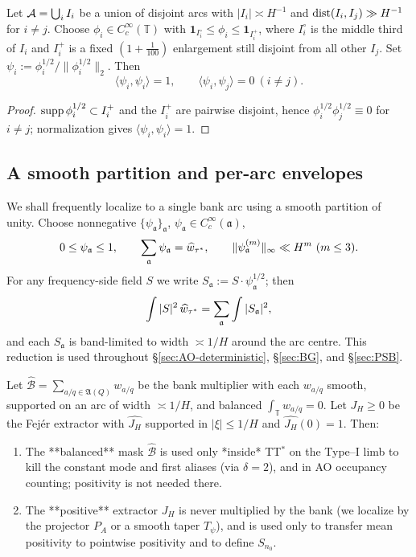 \begin{lemma}\label{lem:AO-gram-full}
Let $\mathcal{A}=\bigcup_i I_i$ be a union of disjoint arcs with $|I_i|\asymp H^{-1}$ and $\operatorname{dist}(I_i,I_j)\gg H^{-1}$ for $i\neq j$.
Choose $\phi_i\in C_c^\infty(\mathbb T)$ with $\mathbf 1_{I_i^\circ}\le \phi_i\le \mathbf 1_{I_i^{+}}$, where $I_i^\circ$ is the middle third of $I_i$ and $I_i^{+}$ is a fixed $(1+\tfrac1{100})$ enlargement still disjoint from all other $I_j$.
Set $\psi_i:=\phi_i^{1/2}/\|\phi_i^{1/2}\|_{2}$. Then
\[
\langle \psi_i,\psi_i\rangle=1,\qquad \langle \psi_i,\psi_j\rangle=0\ (i\ne j).
\]
\end{lemma}
\begin{proof}
$\operatorname{supp}\phi_i^{1/2}\subset I_i^{+}$ and the $I_i^{+}$ are pairwise disjoint, hence $\phi_i^{1/2}\phi_j^{1/2}\equiv 0$ for $i\neq j$; normalization gives $\langle\psi_i,\psi_i\rangle=1$.
\end{proof}


\subsection{A smooth partition and per-arc envelopes}
We shall frequently localize to a single bank arc using a smooth partition of unity. Choose nonnegative $\{\psi_{\mathfrak a}\}_{\mathfrak a}$, $\psi_{\mathfrak a}\in C_c^\infty(\mathfrak a)$,
\[
0\le \psi_{\mathfrak a}\le 1,\qquad \sum_{\mathfrak a}\psi_{\mathfrak a}=\widehat w_{\tau^\ast},\qquad
\|\psi_{\mathfrak a}^{(m)}\|_\infty\ll H^m\ (m\le 3).
\]
For any frequency-side field $S$ we write $S_{\mathfrak a}:=S\cdot \psi_{\mathfrak a}^{1/2}$; then
\[
\int |S|^2\,\widehat w_{\tau^\ast} = \sum_{\mathfrak a}\int |S_{\mathfrak a}|^2,
\]
and each $S_{\mathfrak a}$ is band-limited to width $\asymp 1/H$ around the arc centre. This reduction is used throughout \S\ref{sec:AO-deterministic}, \S\ref{sec:BG}, and \S\ref{sec:PSB}.

\begin{lemma}\label{lem:mask-separation}
Let $\widehat{\mathcal B}=\sum_{a/q\in\mathfrak A(Q)} w_{a/q}$ be the bank multiplier with each $w_{a/q}$ smooth, supported on an arc of width $\asymp 1/H$, and balanced $\int_{\mathbb T} w_{a/q}=0$. Let $J_H\ge 0$ be the Fejér extractor with $\widehat{J_H}$ supported in $|\xi|\le 1/H$ and $\widehat{J_H}(0)=1$.
Then:
\begin{enumerate}
\item The **balanced** mask $\widehat{\mathcal B}$ is used only *inside* TT$^\ast$ on the Type–I limb to kill the constant mode and first aliases (via $\delta=2$), and in AO occupancy counting; positivity is not needed there.
\item The **positive** extractor $J_H$ is never multiplied by the bank (we localize by the projector $P_A$ or a smooth taper $T_\psi$), and is used only to transfer mean positivity to pointwise positivity and to define $S_{n_0}$.
\end{enumerate}
\end{lemma}

